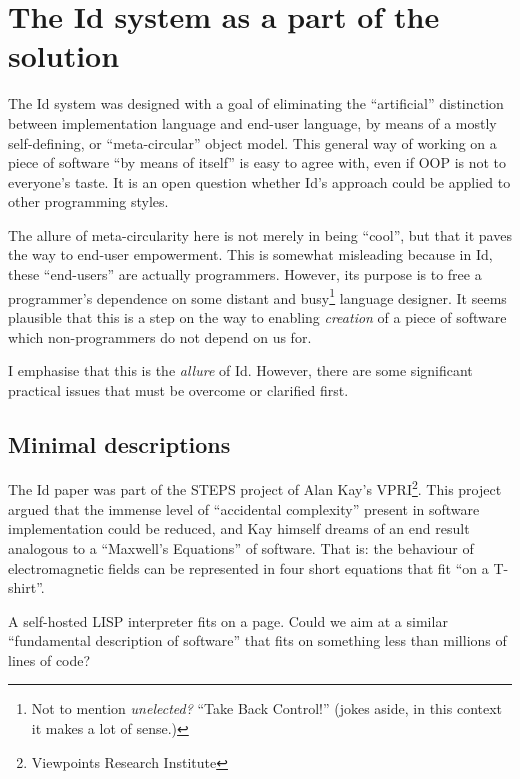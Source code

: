 \hypertarget{the-system-as-a-part-of-the-solution}{%
\section{\texorpdfstring{The Id{} system as a part of the
solution}{The  system as a part of the solution}}\label{the-system-as-a-part-of-the-solution}}

The Id{} system was designed with a goal of eliminating the
``artificial'' distinction between implementation language and end-user
language, by means of a mostly self-defining, or ``meta-circular''
object model. This general way of working on a piece of software ``by
means of itself'' is easy to agree with, even if OOP is not to
everyone's taste. It is an open question whether Id{}'s approach could
be applied to other programming styles.

The allure of meta-circularity here is not merely in being ``cool'', but
that it paves the way to end-user empowerment. This is somewhat
misleading because in Id{}, these ``end-users'' are actually
programmers. However, its purpose is to free a programmer's dependence
on some distant and busy\footnote{Not to mention \emph{unelected?}
  ``Take Back Control!'' (jokes aside, in this context it makes a lot of
  sense.)} language designer. It seems plausible that this is a step on
the way to enabling \emph{creation} of a piece of software which
non-programmers do not depend on us for.

I emphasise that this is the \emph{allure} of Id{}. However, there are
some significant practical issues that must be overcome or clarified
first.

\hypertarget{minimal-descriptions}{%
\subsection{Minimal descriptions}\label{minimal-descriptions}}

The Id{} paper was part of the STEPS project of Alan Kay's
VPRI\footnote{Viewpoints Research Institute}. This project argued that
the immense level of ``accidental complexity'' present in software
implementation could be reduced, and Kay himself dreams of an end result
analogous to a ``Maxwell's Equations'' of software. That is: the
behaviour of electromagnetic fields can be represented in four short
equations that fit ``on a T-shirt''.

A self-hosted LISP interpreter fits on a page. Could we aim at a similar
``fundamental description of software'' that fits on something less than
millions of lines of code?

